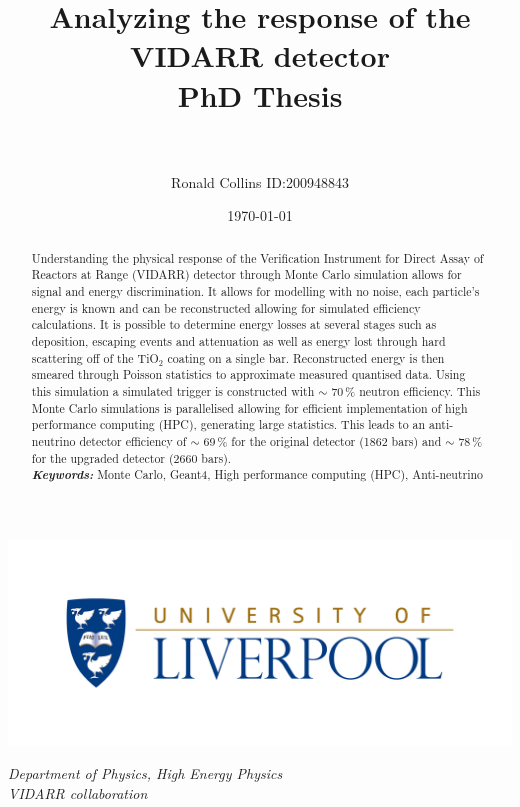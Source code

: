 \documentclass[12pt,a4paper]{article}
\title{Analyzing the response of the VIDARR detector\\
	\large PhD Thesis\\~\\}
\date{\today}
\author{Ronald Collins ID:200948843}
\newenvironment{Figure}
  {\par\medskip\noindent\minipage{\linewidth}}
  {\endminipage\par\medskip}
\begin{document}
\maketitle

\begin{Figure}
 \centering
 \includegraphics[width=1.0\linewidth]{Liverpool_logo}
\end{Figure}


\begin{center}
\textit{Department of Physics, High Energy Physics\\}
\textit{VIDARR collaboration\\}
\end{center}


\newpage
{}
\begin{abstract}
\normalsize Understanding the physical response of the Verification Instrument for Direct Assay of Reactors at Range (VIDARR) detector through Monte Carlo simulation allows for signal and energy discrimination. It allows for modelling with no noise, each particle's energy is known and can be reconstructed allowing for simulated efficiency calculations. It is possible to determine energy losses at several stages such as deposition, escaping events and attenuation as well as energy lost through hard scattering off of the TiO$_2$ coating on a single bar.  Reconstructed energy is then smeared through Poisson statistics to approximate measured quantised data. Using this simulation a simulated trigger is constructed with $\sim$ 70\,\% neutron efficiency. This Monte Carlo simulations is parallelised allowing for efficient implementation of high performance computing (HPC), generating large statistics. This leads to an anti-neutrino detector efficiency of $\sim$ 69\,\% for the original detector (1862 bars) and $\sim$ 78\,\% for the upgraded detector (2660 bars).\\
\providecommand{\keywords}[1]{\textbf{\textit{Keywords:}} #1} %
\keywords{Monte Carlo, Geant4, High performance computing (HPC), Anti-neutrino}
\end{abstract}
\vspace{5mm} %
\tableofcontents
\newpage
\end{document}
